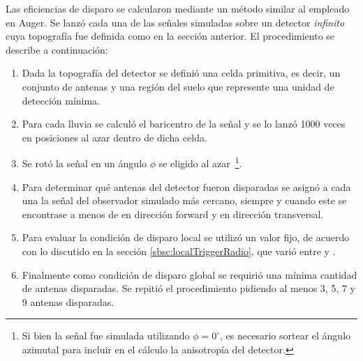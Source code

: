 	Las eficiencias de disparo se calcularon mediante un m\'etodo similar al empleado en Auger.
	Se lanz\'o cada una de las se\~nales simuladas sobre un detector \emph{infinito} cuya topograf\'ia fue definida como en la secci\'on anterior.
	El procedimiento se describe a continuaci\'on:
	\begin{enumerate}
	 \item Dada la topograf\'ia del detector se defini\'o una celda primitiva, es decir, un conjunto de antenas y una regi\'on del suelo que represente una unidad de detecci\'on m\'inima.
	 \item Para cada lluvia se calcul\'o el baricentro de la se\~nal y se lo lanz\'o 1000 veces en posiciones al azar dentro de dicha celda.
	 \item Se rot\'o la se\~nal en un \'angulo $\phi$ se eligido al azar~\footnote{Si bien la se\~nal fue simulada utilizando $\phi=0^\circ$, es necesario sortear el \'angulo azimutal para incluir en el c\'alculo la anisotrop\'ia del detector.}.
	 \item Para determinar qu\'e antenas del detector fueron disparadas se asign\'o a cada una la se\~nal del observador simulado m\'as cercano, siempre y cuando este se encontrase a menos de  en direcci\'on forward y  en direcci\'on transversal.
	 \item Para evaluar la condici\'on de disparo local se utiliz\'o un valor fijo, de acuerdo con lo discutido en la secci\'on \ref{sbsc:localTriggerRadio}, que vari\'o entre  y .
	 \item Finalmente como condici\'on de disparo global se requiri\'o una m\'inima cantidad de antenas disparadas. Se repiti\'o el procedimiento pidiendo al menos 3, 5, 7 y 9 antenas disparadas.
	\end{enumerate}

